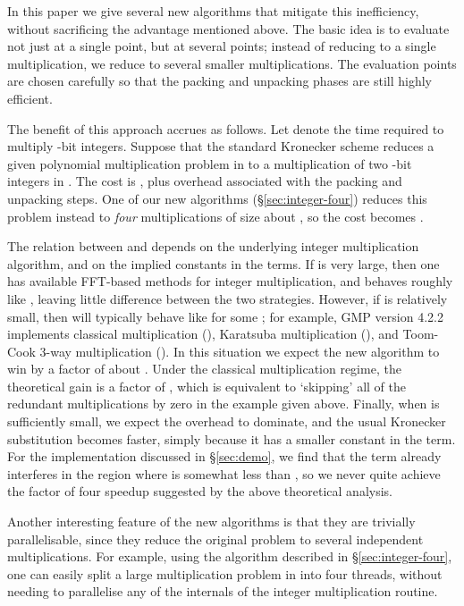 \documentclass{amsart}
\theoremstyle{definition}
\theoremstyle{remark}
\begin{document}
In this paper we give several new algorithms that mitigate this inefficiency, without sacrificing the advantage mentioned above. The basic idea is to evaluate not just at a single point, but at several points; instead of reducing to a single multiplication, we reduce to several smaller multiplications. The evaluation points are chosen carefully so that the packing and unpacking phases are still highly efficient.

The benefit of this approach accrues as follows. Let  denote the time required to multiply -bit integers. Suppose that the standard Kronecker scheme reduces a given polynomial multiplication problem in  to a multiplication of two -bit integers in . The cost is , plus  overhead associated with the packing and unpacking steps. One of our new algorithms (\S\ref{sec:integer-four}) reduces this problem instead to \emph{four} multiplications of size about , so the cost becomes .

The relation between  and  depends on the underlying integer multiplication algorithm, and on the implied constants in the  terms. If  is very large, then one has available FFT-based methods for integer multiplication, and  behaves roughly like , leaving little difference between the two strategies. However, if  is relatively small, then  will typically behave like  for some ; for example, GMP version 4.2.2 implements classical multiplication (), Karatsuba multiplication (), and Toom-Cook 3-way multiplication (). In this situation we expect the new algorithm to win by a factor of about . Under the classical multiplication regime, the theoretical gain is a factor of , which is equivalent to `skipping' all of the redundant multiplications by zero in the example given above. Finally, when  is sufficiently small, we expect the  overhead to dominate, and the usual Kronecker substitution becomes faster, simply because it has a smaller constant in the  term. For the implementation discussed in \S\ref{sec:demo}, we find that the  term already interferes in the region where  is somewhat less than , so we never quite achieve the factor of four speedup suggested by the above theoretical analysis.

Another interesting feature of the new algorithms is that they are trivially parallelisable, since they reduce the original problem to several independent multiplications. For example, using the algorithm described in \S\ref{sec:integer-four}, one can easily split a large multiplication problem in  into four threads, without needing to parallelise any of the internals of the integer multiplication routine.
\end{document}
